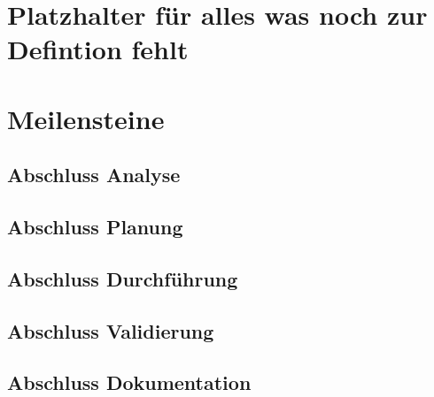 \section{Platzhalter für alles was noch zur Defintion fehlt}

\section{Meilensteine}

\subsection{Abschluss Analyse}
\subsection{Abschluss Planung}
\subsection{Abschluss Durchführung}
\subsection{Abschluss Validierung}
\subsection{Abschluss Dokumentation}
